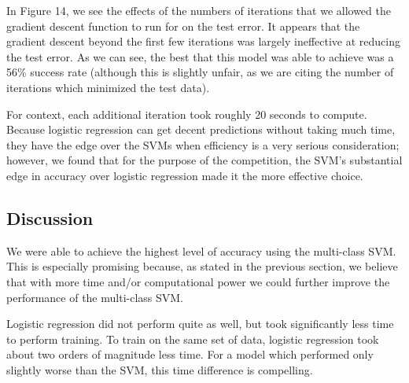 \documentclass{sigchi}
\begin{document}
In Figure 14, we see the effects of the numbers of iterations that we allowed the gradient descent function to run for on the test error. It appears that the gradient descent beyond the first few iterations was largely ineffective at reducing the test error. As we can see, the best that this model was able to achieve was a 56\% success rate (although this is slightly unfair, as we are citing the number of iterations which minimized the test data).

For context, each additional iteration took roughly 20 seconds to compute. Because logistic regression can get decent predictions without taking much time, they have the edge over the SVMs when efficiency is a very serious consideration; however, we found that for the purpose of the competition, the SVM's substantial edge in accuracy over logistic regression made it the more effective choice.

\subsection{Discussion}

We were able to achieve the highest level of accuracy using the multi-class SVM. This is especially promising because, as stated in the previous section, we believe that with more time and/or computational power we could further improve the performance of the multi-class SVM.

Logistic regression did not perform quite as well, but took significantly less time to perform training. To train on the same set of data, logistic regression took about two orders of magnitude less time. For a model which performed only slightly worse than the SVM, this time difference is compelling.
\end{document}
